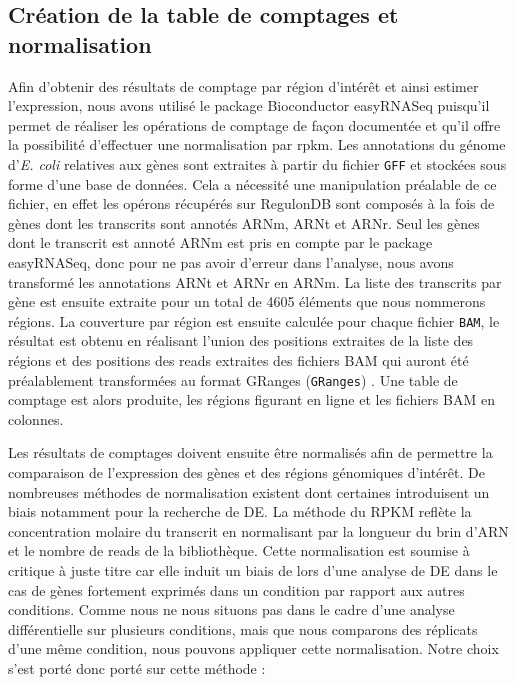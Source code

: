 \documentclass[12pt,a4paper]{report}
\begin{document}
\begin{onehalfspace}
\section*{Création de la table de comptages et normalisation}
Afin d'obtenir des résultats de comptage par région d'intérêt et ainsi estimer l'expression, nous avons utilisé le package Bioconductor easyRNASeq \citep{Delhomme2012} puisqu'il permet de réaliser les opérations de comptage de façon documentée et qu'il offre la possibilité d'effectuer une normalisation par \gls{rpkm}. Les annotations du génome d'\textit{E. coli} relatives aux gènes sont extraites à partir du fichier \texttt{GFF} et stockées sous forme d'une base de données. Cela a nécessité une manipulation préalable de ce fichier, en effet les opérons récupérés sur RegulonDB sont composés à la fois de gènes dont les transcrits sont annotés ARNm, ARNt et ARNr. Seul les gènes dont le transcrit est annoté ARNm est pris en compte par le package easyRNASeq, donc pour ne pas avoir d'erreur dans l'analyse, nous avons transformé les annotations ARNt et ARNr en ARNm.
La liste des transcrits par gène est ensuite extraite pour un total de 4605 éléments que nous nommerons régions. La couverture par région est ensuite calculée pour chaque fichier \texttt{BAM}, le résultat est obtenu en réalisant l'union des positions extraites de la liste des régions et des positions des reads extraites des fichiers BAM qui auront été préalablement transformées au format \gls{GRanges} (\texttt{GRanges})  \citep{Lawrence2013}. Une table de comptage est alors produite, les régions figurant en ligne et les fichiers BAM en colonnes.

Les résultats de comptages doivent ensuite être normalisés afin de permettre la comparaison de l'expression des gènes et des régions génomiques d'intérêt. De nombreuses méthodes de normalisation existent dont certaines introduisent un biais notamment pour la recherche de DE. La méthode du RPKM reflète la concentration molaire du transcrit en normalisant par la longueur du brin d'ARN et le nombre de reads de la bibliothèque. Cette normalisation est soumise à critique à juste titre \citep{Dillies2013} car elle induit un biais de lors d'une analyse de DE dans le cas de gènes fortement exprimés dans un condition par rapport aux autres conditions. Comme nous ne nous situons pas dans le cadre d'une analyse différentielle sur plusieurs conditions, mais que nous comparons des réplicats d'une même condition, nous pouvons appliquer cette normalisation. Notre choix s'est porté donc porté sur cette méthode \citep{Mortazavi2008} :


\end{onehalfspace}
\end{document}
